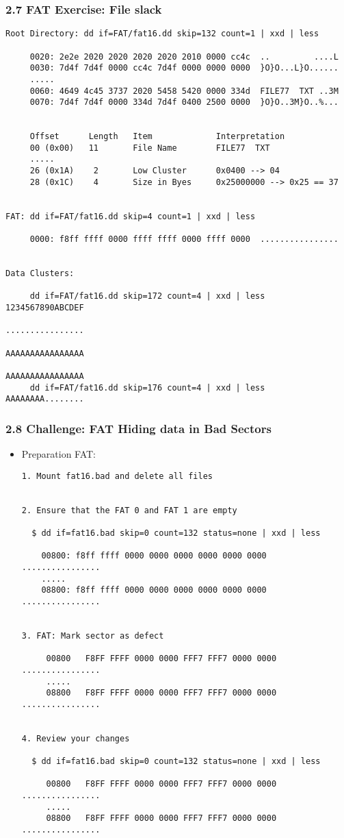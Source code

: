 \begin{frame}[fragile]
  \frametitle{2.7 FAT Exercise: File slack}
  \begin{lstlisting}[basicstyle=\tiny]
Root Directory: dd if=FAT/fat16.dd skip=132 count=1 | xxd | less

     0020: 2e2e 2020 2020 2020 2020 2010 0000 cc4c  ..         ....L
     0030: 7d4f 7d4f 0000 cc4c 7d4f 0000 0000 0000  }O}O...L}O......
     .....
     0060: 4649 4c45 3737 2020 5458 5420 0000 334d  FILE77  TXT ..3M
     0070: 7d4f 7d4f 0000 334d 7d4f 0400 2500 0000  }O}O..3M}O..%...
 
 
     Offset      Length   Item             Interpretation
     00 (0x00)   11       File Name        FILE77  TXT
     .....
     26 (0x1A)    2       Low Cluster      0x0400 --> 04
     28 (0x1C)    4       Size in Byes     0x25000000 --> 0x25 == 37

  
FAT: dd if=FAT/fat16.dd skip=4 count=1 | xxd | less

     0000: f8ff ffff 0000 ffff ffff 0000 ffff 0000  ................

  
Data Clusters:

     dd if=FAT/fat16.dd skip=172 count=4 | xxd | less    1234567890ABCDEF
                                                         ................
                                                         AAAAAAAAAAAAAAAA
                                                         AAAAAAAAAAAAAAAA
     dd if=FAT/fat16.dd skip=176 count=4 | xxd | less    AAAAAAAA........
\end{lstlisting}
\end{frame}


\begin{frame}[fragile]
  \frametitle{2.8 Challenge: FAT Hiding data in Bad Sectors}
    \begin{itemize}
	    \item[] Preparation FAT:
  \begin{lstlisting}[basicstyle=\tiny]
1. Mount fat16.bad and delete all files


2. Ensure that the FAT 0 and FAT 1 are empty

  $ dd if=fat16.bad skip=0 count=132 status=none | xxd | less

    00800: f8ff ffff 0000 0000 0000 0000 0000 0000  ................
    .....
    08800: f8ff ffff 0000 0000 0000 0000 0000 0000  ................


3. FAT: Mark sector as defect

     00800   F8FF FFFF 0000 0000 FFF7 FFF7 0000 0000  ................
     .....
     08800   F8FF FFFF 0000 0000 FFF7 FFF7 0000 0000  ................


4. Review your changes

  $ dd if=fat16.bad skip=0 count=132 status=none | xxd | less

     00800   F8FF FFFF 0000 0000 FFF7 FFF7 0000 0000  ................
     .....
     08800   F8FF FFFF 0000 0000 FFF7 FFF7 0000 0000  ................
\end{lstlisting}
    \end{itemize}
\end{frame}


